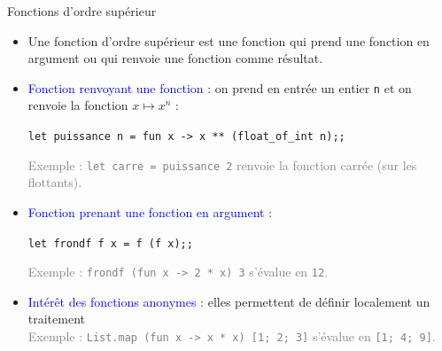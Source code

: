 \documentclass[10pt]{beamer}
\begin{document}
\begin{frame}{\Ctitle}{\stitle}
	\begin{block}{Fonctions d'ordre supérieur}
		\begin{itemize}
			\item<1-> Une fonction d'\textcolor{BrickRed}{ordre supérieur} est une fonction qui prend une fonction en argument ou qui renvoie une fonction comme résultat.
			\item<2-> \textcolor{blue}{Fonction renvoyant une fonction} : on prend en entrée un entier {\tt n} et on renvoie la fonction $x \mapsto x^n$ :
				\begin{center}
					\texttt{let puissance n = fun x -> x ** (float_of_int n);;}
				\end{center}
				\textcolor{gray}{\small Exemple : \texttt{let carre = puissance 2} renvoie la fonction carrée (sur les flottants).}
			\item<4-> \textcolor{blue}{Fonction prenant une fonction en argument} :
				\begin{center}
					\texttt{let frondf f x = f (f x);;}
				\end{center}
				\textcolor{gray}{\small Exemple : \texttt{frondf (fun x -> 2 * x) 3} s'évalue en \texttt{12}.}
			\item<6-> \textcolor{blue}{Intérêt des fonctions anonymes} : elles permettent de définir localement un traitement \\
				\onslide<7->\textcolor{gray}{\small Exemple : \texttt{List.map (fun x -> x * x) [1; 2; 3]} s'évalue en \texttt{[1; 4; 9]}.}
		\end{itemize}
	\end{block}
\end{frame}
\end{document}
